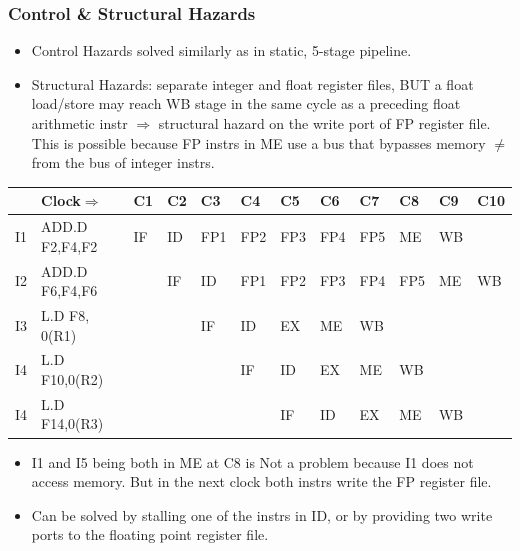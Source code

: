 \documentclass{beamer}
\renewcommand{\emph}[1]{\textcolor{structure}{#1}}
\newcommand{\emp}[1]{\textcolor{DikuRed}{ #1}}
\begin{document}
\begin{frame}[fragile,t]
\frametitle{Control \& Structural Hazards}

\bigskip

\begin{scriptsize}
\begin{itemize}
\item \emp{Control Hazards} solved similarly as in static, 5-stage pipeline.\smallskip
\item \emp{Structural Hazards}: separate integer and float register files, BUT
        a float load/store may reach WB stage in the same cycle as a preceding
        float arithmetic instr $\Rightarrow$ structural hazard \emp{on the write port 
        of FP register file}.   \emph{This is possible because FP instrs in ME use
        a bus that bypasses memory $\neq$ from the bus of integer instrs.}  
\end{itemize}
\bigskip

\begin{tiny}
\begin{tabular}{llllllllllll}
\hline
   & Clock$\Rightarrow$ & C1 & C2 & C3 & C4 & C5 & C6 & C7 & C8 & C9 & C10            \\\hline
I1 & ADD.D F2,F4,F2     & IF & ID & FP1 & FP2 & FP3 & FP4 & FP5 & ME & \alert{WB} &      \\
I2 & ADD.D F6,F4,F6     &    & IF & ID & FP1 & FP2 & FP3 & FP4 & FP5 & ME & WB   \\
I3 & L.D   F8, 0(R1)    &    &    & IF & ID  & EX  & ME  & WB  &     &    &      \\
I4 & L.D   F10,0(R2)    &    &    &    & IF  & ID  & EX  & ME  & WB  &    &      \\
I4 & L.D   F14,0(R3)    &    &    &    &     & IF  & ID  & EX  & ME  & \alert{WB} &      \\\hline
\end{tabular}
\end{tiny}
\bigskip

\begin{itemize}
\item I1 and I5 being both in ME at C8 \emph{is Not a problem} 
        because I1 does not access memory. But in the next clock 
        \emp{both instrs write the FP register} file.\smallskip
\item Can be solved by stalling one of the instrs in ID, or by providing two write ports to
        the floating point register file.
\end{itemize}
\end{scriptsize}
\end{frame}
\end{document}
